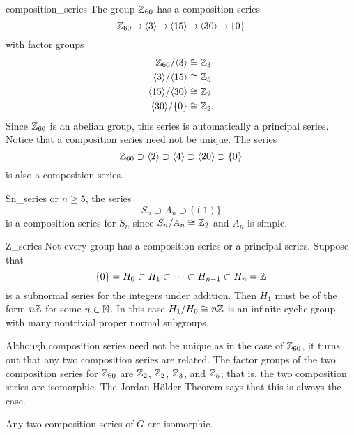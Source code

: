 \begin{example}{composition_series}
The group ${\Bbb Z}_{60}$ has  a composition series 
\[
{\Bbb Z}_{60} \supset \langle 3 \rangle \supset  \langle 15 \rangle
\supset \langle 30 \rangle  \supset \{ 0 \}
\]
with factor groups
\begin{align*}
{\Bbb Z}_{60} / \langle 3 \rangle & \cong  {\Bbb Z}_{3} \\
\langle 3 \rangle / \langle 15 \rangle & \cong  {\Bbb Z}_{5} \\
\langle 15 \rangle / \langle 30 \rangle & \cong  {\Bbb Z}_{2} \\
\langle 30 \rangle / \{ 0 \} & \cong  {\Bbb Z}_2.
\end{align*}
Since ${\Bbb Z}_{60}$ is an abelian group, this series is
automatically a principal series. Notice that a composition series
need not be unique.  The series 
\[
{\Bbb Z}_{60} \supset \langle 2 \rangle \supset \langle 4 \rangle 
\supset  \langle 20 \rangle \supset \{ 0 \}
\]
is also a composition series.
\end{example}
 
 
 
\begin{example}{Sn_series}
or $n \geq 5$, the series
\[
S_n \supset A_n \supset \{ (1) \}
\]
is a composition series for $S_n$ since $S_n / A_n \cong {\Bbb Z}_2$
and $A_n$ is simple.
\end{example}
 
 
 
\begin{example}{Z_series}
Not every group has a composition series or a principal series.
Suppose that 
\[
\{ 0 \} = H_0 \subset H_1 \subset \cdots \subset H_{n-1}
\subset H_n = {\Bbb Z}
\]
is a subnormal series for the integers under addition. Then $H_1$ must
be of the form $n {\Bbb Z}$ for some $n \in {\Bbb N}$. In this case
$H_1 / H_0 \cong n {\Bbb Z}$ is an infinite cyclic group with many
nontrivial proper normal subgroups. 
\end{example}
 
 
 
Although composition series need not be unique as in the case of
${\Bbb Z}_{60}$, it turns out that any two composition series are
related. The factor groups of the two composition series for ${\Bbb 
Z}_{60}$ are ${\Bbb Z}_2$,  ${\Bbb Z}_2$,  ${\Bbb Z}_3$, and  ${\Bbb
Z}_5$; that is,  the two composition series are isomorphic. The
Jordan-H\"{o}lder Theorem says that this is always the case.
 
 
\begin{theorem}
Any two composition series of $G$ are isomorphic.
\end{theorem}
 
